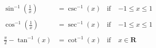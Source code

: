 \begin{equation}
\begin{aligned}
    \sin^{-1} \left(\frac{1}{x}\right) &= \csc^{-1}(x) & \text{if}\; & -1 \leq x \leq 1 \\
    &\\
    \cos^{-1} \left(\frac{1}{x}\right) &= \sec^{-1}(x) & \text{if}\; & -1 \leq x \leq 1 \\
    &\\
    \frac{\pi}{2} - \tan^{-1}(x) &= \cot^{-1}(x) & \text{if}\; & x \in \mathbf{R} \\
\end{aligned}
\end{equation}